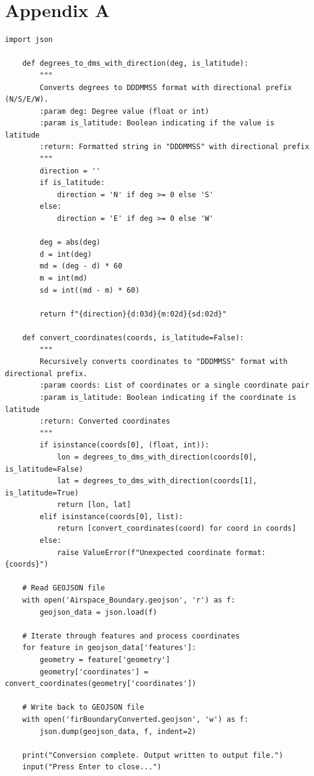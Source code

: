 \documentclass[stu, a4paper, 12pt, floatsintext]{apa7}
\numberwithin{figure}{section}
\numberwithin{table}{section}
\numberwithin{equation}{section}
\begin{document}
\section{Appendix A}
\begin{lstlisting}[style=mypython, caption={Convert GeoJSON Coordinates (in radians) to DDDMMSS Format with Direction. This script was used as described in Chapter 2.}]
    import json
    
    def degrees_to_dms_with_direction(deg, is_latitude):
        """
        Converts degrees to DDDMMSS format with directional prefix (N/S/E/W).
        :param deg: Degree value (float or int)
        :param is_latitude: Boolean indicating if the value is latitude
        :return: Formatted string in "DDDMMSS" with directional prefix
        """
        direction = ''
        if is_latitude:
            direction = 'N' if deg >= 0 else 'S'
        else:
            direction = 'E' if deg >= 0 else 'W'
    
        deg = abs(deg)
        d = int(deg)
        md = (deg - d) * 60
        m = int(md)
        sd = int((md - m) * 60)
    
        return f"{direction}{d:03d}{m:02d}{sd:02d}"
    
    def convert_coordinates(coords, is_latitude=False):
        """
        Recursively converts coordinates to "DDDMMSS" format with directional prefix.
        :param coords: List of coordinates or a single coordinate pair
        :param is_latitude: Boolean indicating if the coordinate is latitude
        :return: Converted coordinates
        """
        if isinstance(coords[0], (float, int)):
            lon = degrees_to_dms_with_direction(coords[0], is_latitude=False)
            lat = degrees_to_dms_with_direction(coords[1], is_latitude=True)
            return [lon, lat]
        elif isinstance(coords[0], list):
            return [convert_coordinates(coord) for coord in coords]
        else:
            raise ValueError(f"Unexpected coordinate format: {coords}")
    
    # Read GEOJSON file
    with open('Airspace_Boundary.geojson', 'r') as f:
        geojson_data = json.load(f)
    
    # Iterate through features and process coordinates
    for feature in geojson_data['features']:
        geometry = feature['geometry']
        geometry['coordinates'] = convert_coordinates(geometry['coordinates'])
    
    # Write back to GEOJSON file
    with open('firBoundaryConverted.geojson', 'w') as f:
        json.dump(geojson_data, f, indent=2)
    
    print("Conversion complete. Output written to output file.")
    input("Press Enter to close...")
\end{lstlisting}
\end{document}
